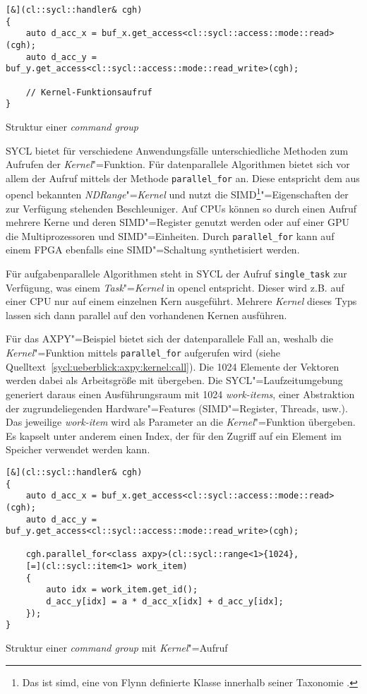 \begin{code}
    \begin{verbatim}
[&](cl::sycl::handler& cgh)
{
    auto d_acc_x = buf_x.get_access<cl::sycl::access::mode::read>(cgh);
    auto d_acc_y = buf_y.get_access<cl::sycl::access::mode::read_write>(cgh);

    // Kernel-Funktionsaufruf
}
    \end{verbatim}
    \caption{Struktur einer \textit{command group}}
    \label{sycl:ueberblick:axpy:kernel:cg}
\end{code}
\vspace{5mm}
SYCL bietet für verschiedene Anwendungsfälle unterschiedliche Methoden zum
Aufrufen der \textit{Kernel}"=Funktion. Für datenparallele Algorithmen bietet sich
vor allem der Aufruf mittels der Methode \texttt{parallel\_for} an. Diese
entspricht dem aus \gls{opencl} bekannten \textit{NDRange}"=\textit{Kernel} und
nutzt die SIMD\footnote{Das ist \gls{simd}, eine von Flynn definierte Klasse
innerhalb seiner Taxonomie \cite[vgl.][]{flynn1966}.}"=Eigenschaften der zur
Verfügung stehenden Beschleuniger. Auf CPUs können so durch einen Aufruf mehrere
Kerne und deren SIMD"=Register genutzt werden oder auf einer GPU die
Multiprozessoren und SIMD"=Einheiten. Durch \texttt{parallel\_for} kann auf
einem FPGA ebenfalls eine SIMD"=Schaltung synthetisiert werden. 

Für aufgabenparallele Algorithmen steht in SYCL der Aufruf \texttt{single\_task}
zur Verfügung, was einem \textit{Task}"=\textit{Kernel} in \gls{opencl}
entspricht. Dieser wird z.B. auf einer CPU nur auf einem einzelnen Kern
ausgeführt. Mehrere \textit{Kernel} dieses Typs lassen sich dann parallel auf
den vorhandenen Kernen ausführen.

Für das AXPY"=Beispiel bietet sich der datenparallele Fall an, weshalb die
\textit{Kernel}"=Funktion mittels \texttt{parallel\_for} aufgerufen wird (siehe
Quelltext~\ref{sycl:ueberblick:axpy:kernel:call}). Die \num{1024} Elemente der
Vektoren werden dabei als Arbeitsgröße mit übergeben. Die SYCL"=Laufzeitumgebung
generiert daraus einen Ausführungsraum mit \num{1024} \textit{work-items}, einer
Abstraktion der zugrundeliegenden Hardware"=Features (SIMD"=Register, Threads,
usw.). Das jeweilige \textit{work-item} wird als Parameter an die
\textit{Kernel}"=Funktion übergeben. Es kapselt unter anderem einen Index, der
für den Zugriff auf ein Element im Speicher verwendet werden kann. 

\begin{code}
    \begin{verbatim}
[&](cl::sycl::handler& cgh)
{
    auto d_acc_x = buf_x.get_access<cl::sycl::access::mode::read>(cgh);
    auto d_acc_y = buf_y.get_access<cl::sycl::access::mode::read_write>(cgh);

    cgh.parallel_for<class axpy>(cl::sycl::range<1>{1024},
    [=](cl::sycl::item<1> work_item)
    {
        auto idx = work_item.get_id();
        d_acc_y[idx] = a * d_acc_x[idx] + d_acc_y[idx];
    });
}
    \end{verbatim}
    \caption{Struktur einer \textit{command group} mit \textit{Kernel}"=Aufruf}
    \label{sycl:ueberblick:axpy:kernel:call}
\end{code}

